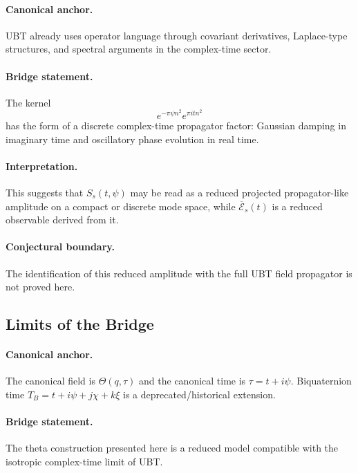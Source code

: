 \documentclass[11pt,a4paper]{article}
\begin{document}
\paragraph{Canonical anchor.}
UBT already uses operator language through covariant derivatives, Laplace-type structures, and spectral arguments in the complex-time sector.

\paragraph{Bridge statement.}
The kernel
\begin{equation}
e^{-\pi \psi n^2} e^{\pi i t n^2}
\end{equation}
has the form of a discrete complex-time propagator factor: Gaussian damping in imaginary time and oscillatory phase evolution in real time.

\paragraph{Interpretation.}
This suggests that $S_s(t,\psi)$ may be read as a reduced projected propagator-like amplitude on a compact or discrete mode space, while $\overline{\mathcal{E}}_s(t)$ is a reduced observable derived from it.

\paragraph{Conjectural boundary.}
The identification of this reduced amplitude with the full UBT field propagator is not proved here.

\subsection{Limits of the Bridge}

\paragraph{Canonical anchor.}
The canonical field is $\Theta(q,\tau)$ and the canonical time is $\tau = t + i\psi$.
Biquaternion time $T_B = t + i\psi + j\chi + k\xi$ is a deprecated/historical extension.

\paragraph{Bridge statement.}
The theta construction presented here is a reduced model compatible with the isotropic complex-time limit of UBT.
\end{document}
